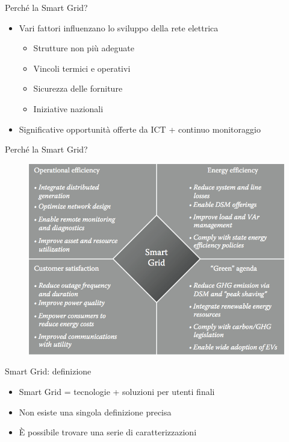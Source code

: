 \begin{frame}{Perché la Smart Grid?}
	\begin{itemize}[<+- | alert@+>]
	\item Vari fattori influenzano lo sviluppo della rete elettrica
	 \begin{itemize}
	  	\item Strutture non più adeguate
	  	\item Vincoli termici e operativi
	  	\item Sicurezza delle forniture
	  	\item Iniziative nazionali
	 \end{itemize}
	\item Significative opportunità offerte da ICT + continuo monitoraggio
	\end{itemize}
\end{frame}


\begin{frame}{Perché la Smart Grid?}
	\begin{figure}[h] 
		\includegraphics[scale=0.25]{imgs/benefits.png}
	\end{figure}
\end{frame}


\begin{frame}{Smart Grid: definizione}
\begin{itemize}[<+- | alert@+>]
\item Smart Grid = tecnologie + soluzioni per utenti finali
\item Non esiste una singola definizione precisa
\item È possibile trovare una serie di caratterizzazioni
\end{itemize}
\end{frame}

